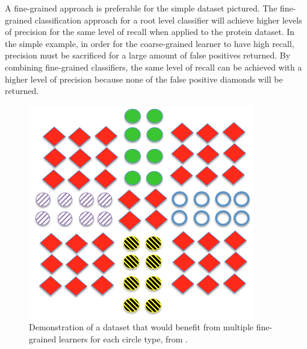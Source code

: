 \documentclass[ms]{nuthesis}
\begin{document}
\par A fine-grained approach is preferable for the simple dataset pictured.
The fine-grained classification approach for a root
level classifier will achieve higher levels of precision for the same level of recall when
applied to the protein dataset. In the simple example, in order for the coarse-grained
learner to have high recall, precision must be sacrificed for a large amount of false positives returned.
By combining fine-grained classifiers, the same level of recall can be achieved with a
higher level of precision because none of the false positive diamonds will be returned.

\FloatBarrier
\begin{figure}[!htb]
	\centering
    \includegraphics[width=0.5\columnwidth]{fig/union}
    \caption{Demonstration of a dataset that would benefit from multiple fine-grained
    learners for each circle type, from \cite{yugi}.}
    \label{fig:union}
\end{figure}
\FloatBarrier
\end{document}
